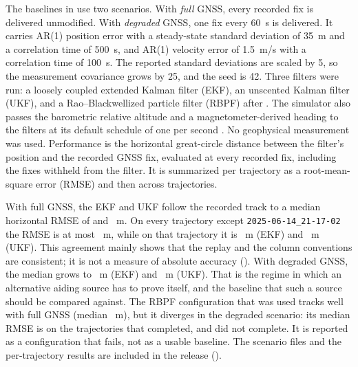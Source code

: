 The baselines in  use two scenarios. With \emph{full} GNSS, every recorded fix is delivered unmodified. With \emph{degraded} GNSS, one fix every 60~s is delivered. It carries AR(1) position error with a steady-state standard deviation of 35~m and a correlation time of 500~s, and AR(1) velocity error of 1.5~m/s with a correlation time of 100~s. The reported standard deviations are scaled by 5, so the measurement covariance grows by 25, and the seed is 42. Three filters were run: a loosely coupled extended Kalman filter (EKF), an unscented Kalman filter (UKF), and a Rao--Blackwellized particle filter (RBPF) after \citet{canciani2017airborne} . The simulator also passes the barometric relative altitude and a magnetometer-derived heading to the filters at its default schedule of one per second . No geophysical measurement was used. Performance is the horizontal great-circle distance between the filter's position and the recorded GNSS fix, evaluated at every recorded fix, including the fixes withheld from the filter. It is summarized per trajectory as a root-mean-square error (RMSE) and then across trajectories.

\begin{table}[t]
\centering
\caption{Reference baselines: horizontal RMSE against the recorded GNSS track, summarized over trajectories, and the median vertical RMSE. \(n\) is the number of trajectories on which the run completed. Errors of 10~km or more are given in kilometres.}
\label{tab:benchmark}
\small
\setlength{\tabcolsep}{4pt}

\end{table}

With full GNSS, the EKF and UKF follow the recorded track to a median horizontal RMSE of \numEkfFullMedian{} and \numUkfFullMedian~m. On every trajectory except \texttt{2025-06-14\_21-17-02} the RMSE is at most \numEkfFullMaxOthers~m, while on that trajectory it is \numEkfFullBad~m (EKF) and \numUkfFullBad~m (UKF). This agreement mainly shows that the replay and the column conventions are consistent; it is not a measure of absolute accuracy (). With degraded GNSS, the median grows to \numEkfDegradedMedian~m (EKF) and \numUkfDegradedMedian~m (UKF). That is the regime in which an alternative aiding source has to prove itself, and the baseline that such a source should be compared against. The RBPF configuration that was used tracks well with full GNSS (median \numRbpfFullMedian~m), but it diverges in the degraded scenario: its median RMSE is \numRbpfDegradedMedian{} on the \numRbpfDegradedN{} trajectories that completed, and \numRbpfDegradedMissing{} did not complete. It is reported as a configuration that fails, not as a usable baseline. The scenario files and the per-trajectory results are included in the release ().
